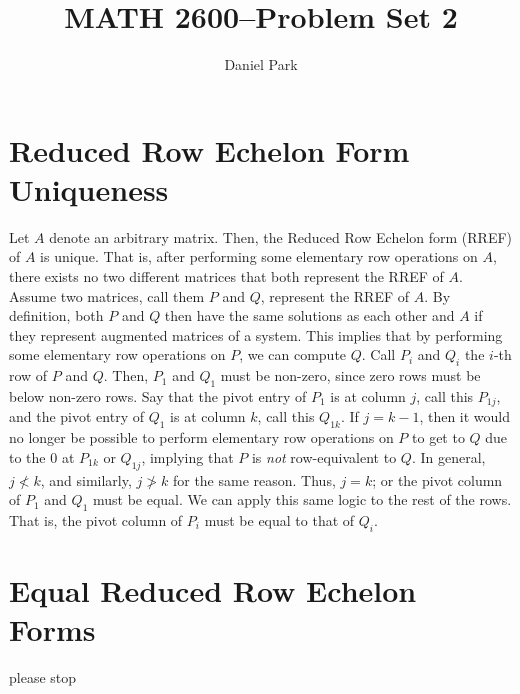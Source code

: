 \documentclass[11pt]{article}
\title{MATH 2600--Problem Set 2}
\author{Daniel Park}
\begin{document}
\maketitle

\section{Reduced Row Echelon Form Uniqueness}
Let \(A\) denote an arbitrary matrix. Then, the Reduced Row Echelon form (RREF) of \(A\) is unique. That is, after performing some elementary row operations on \(A\), there exists no two different matrices that both represent the RREF of \(A\).\newline
Assume two matrices, call them \(P\) and \(Q\), represent the RREF of \(A\). By definition, both \(P\) and \(Q\) then have the same solutions as each other and \(A\) if they represent augmented matrices of a system. This implies that by performing some elementary row operations on \(P\), we can compute \(Q\).\newline
Call \(P_i\) and \(Q_i\) the \(i\)-th row of \(P\) and \(Q\). Then, \(P_1\) and \(Q_1\) must be non-zero, since zero rows must be below non-zero rows. Say that the pivot entry of \(P_1\) is at column \(j\), call this \(P_{1j}\), and the pivot entry of \(Q_1\) is at column \(k\), call this \(Q_{1k}\). If \(j = k - 1\), then it would no longer be possible to perform elementary row operations on \(P\) to get to \(Q\) due to the 0 at \(P_{1k}\) or \(Q_{1j}\), implying that \(P\) is \textit{not} row-equivalent to \(Q\). In general, \(j \nless k\), and similarly, \(j \ngtr k\) for the same reason. Thus, \(j = k\); or the pivot column of \(P_1\) and \(Q_1\) must be equal.\newline
We can apply this same logic to the rest of the rows. That is, the pivot column of \(P_i\) must be equal to that of \(Q_i\). 
\section{Equal Reduced Row Echelon Forms}
\indent please stop
\end{document}
